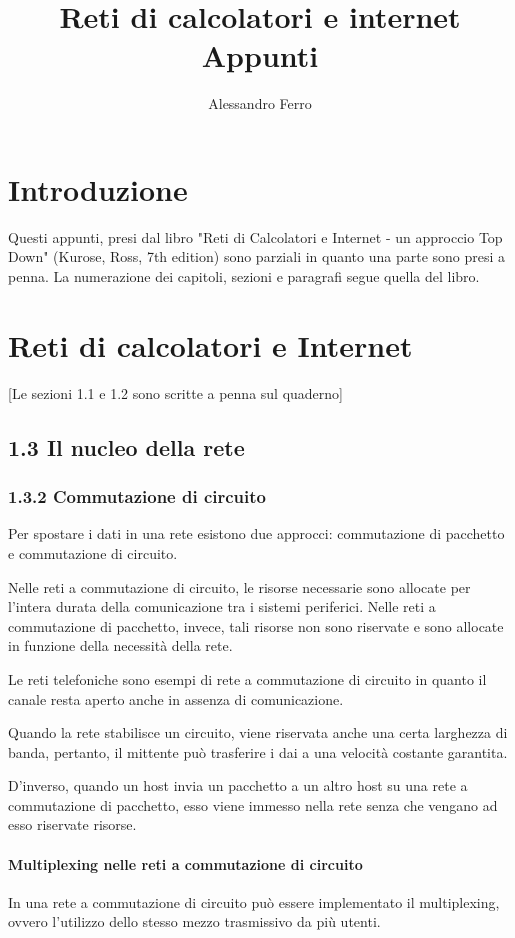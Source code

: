 \documentclass{book}
\title{%
	Reti di calcolatori e internet\\
	\small Appunti}
\author{Alessandro Ferro}
\date{}
\begin{document}
\maketitle
	
\chapter*{Introduzione}
Questi appunti, presi dal libro "Reti di Calcolatori e Internet - un approccio Top Down" (Kurose, Ross, 7th edition) sono parziali in quanto una parte sono presi a penna. La numerazione dei capitoli, sezioni e paragrafi segue quella del libro.
		
\chapter{Reti di calcolatori e Internet}
	
[Le sezioni 1.1 e 1.2 sono scritte a penna sul quaderno]
	
\section*{1.3 Il nucleo della rete}
	
\subsection*{1.3.2 Commutazione di circuito}
Per spostare i dati in una rete esistono due approcci: commutazione di pacchetto e commutazione di circuito. 
	
Nelle reti a commutazione di circuito, le risorse necessarie sono allocate per l'intera durata della comunicazione tra i sistemi periferici. Nelle reti a commutazione di pacchetto, invece, tali risorse non sono riservate e sono allocate in funzione della necessità della rete.
	
Le reti telefoniche sono esempi di rete a commutazione di circuito in quanto il canale resta aperto anche in assenza di comunicazione.
	
Quando la rete stabilisce un circuito, viene riservata anche una certa larghezza di banda, pertanto, il mittente può trasferire i dai a una velocità costante garantita.
	
D'inverso, quando un host invia un pacchetto a un altro host su una rete a commutazione di pacchetto, esso viene immesso nella rete senza che vengano ad esso riservate risorse.
	
\subsubsection{Multiplexing nelle reti a commutazione di circuito}
In una rete a commutazione di circuito può essere implementato il multiplexing, ovvero l'utilizzo dello stesso mezzo trasmissivo da più utenti.
	
\end{document}
